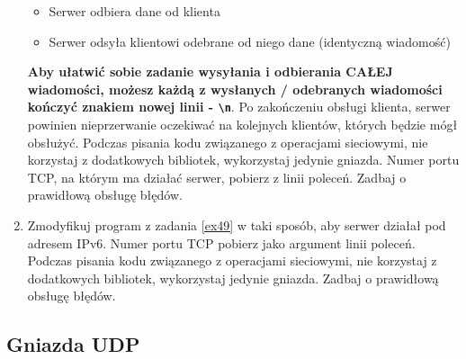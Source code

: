 \documentclass{article}
\begin{document}
\begin{enumerate}[label=\textbf{4.\arabic*}]
\begin{itemize}
\item Serwer odbiera dane od klienta
\item Serwer odsyła klientowi odebrane od niego dane (identyczną wiadomość) 
\end{itemize}

\noindent \textbf{Aby ułatwić sobie zadanie wysyłania i odbierania CAŁEJ wiadomości, możesz każdą z wysłanych / odebranych wiadomości kończyć znakiem nowej linii - \texttt{\textbackslash n}}. Po zakończeniu obsługi klienta, serwer powinien nieprzerwanie oczekiwać na kolejnych klientów, których będzie mógł obsłużyć. Podczas pisania kodu związanego z operacjami sieciowymi, nie korzystaj z dodatkowych bibliotek, wykorzystaj jedynie gniazda. Numer portu TCP, na którym ma działać serwer, pobierz z linii poleceń. Zadbaj o prawidłową obsługę błędów. 

\item Zmodyfikuj program z zadania \ref{ex49} w taki sposób,  aby serwer działał pod adresem IPv6.   Numer portu TCP pobierz jako argument linii poleceń. Podczas pisania kodu związanego z operacjami sieciowymi, nie korzystaj z dodatkowych bibliotek, wykorzystaj jedynie gniazda. Zadbaj o prawidłową obsługę błędów.
\end{enumerate}

\subsection*{Gniazda UDP}
\end{document}
